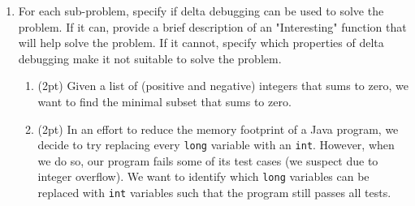 \documentclass{report}
\newif\ifkey
\newcommand{\answerlong}[1]{\ifkey\color{red}\textbf{#1}\color{black}\else\vspace{0.5in}\fi\xspace}
\newcommand*{\pts}[1]{\addtocounter{points}{#1}(#1pt)}
\begin{document}
\begin{spacing}{1.4}
\begin{enumerate}[leftmargin=*]
\begin{enumerate}
  \item \pts{4} Describe, in one sentence each, two risks associated with Radhia's proposal.\\
    \answerlong{Any two of the following sentences would be a good answer (other answers are possible).
      Reducing integration testing may increase the risk that bugs at the boundary between modules are not detected.
      Static analysis may produce too many false positive alarms.
      Static analysis may be unsound or may miss bugs (even of the kind it is supposed to find).
      Static analysis errors may be too hard to understand.
    }
    \end{enumerate}

  \item For each sub-problem, specify if delta debugging can be used
    to solve the problem. If it can, provide a brief description of an "Interesting" function that will help solve the problem. If it
    cannot, specify which properties of delta debugging make it not suitable to solve the problem.
    \begin{enumerate}

    \item \pts{2} Given a list of (positive and negative) integers that sums to zero, we want to find the minimal subset that sums to zero.\\
      \answerlong{Delta debugging is not suitable for this use case: integer summation is ambiguous.}

    \item \pts{2} In an effort to reduce the memory footprint of a Java program, we decide to try replacing
      every \lstinline{long} variable with an \lstinline{int}. However, when we do so, our program fails some of its test cases (we suspect due to integer overflow). We want to
      identify which \lstinline{long} variables can be replaced with \lstinline{int} variables such that the program still passes all tests.\\
      \answerlong{Delta debugging is suitable for this use case. We can define script is_interesting.sh such that it takes a
list of occurrences of long and replaces each with an int. The script exits 1 if the code compiles and runs the tests
successfully, and it exits 0 if the code doesn't compile or fails any tests.}


\end{enumerate}
\end{enumerate}
\end{spacing}
\end{document}

